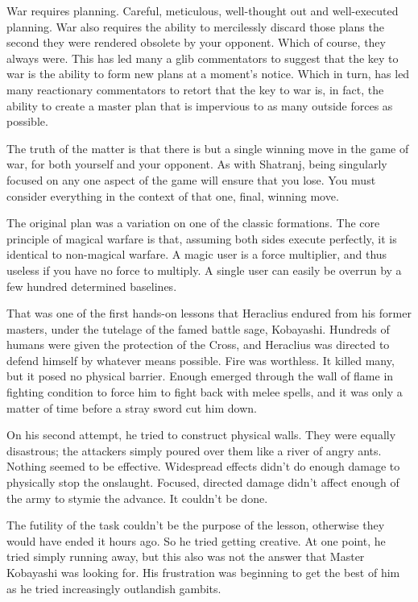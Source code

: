 War requires planning. Careful, meticulous, well-thought out and well-executed planning. War also requires the ability to mercilessly discard those plans the second they were rendered obsolete by your opponent. Which of course, they always were. This has led many a glib commentators to suggest that the key to war is the ability to form new plans at a moment’s notice. Which in turn, has led many reactionary commentators to retort that the key to war is, in fact, the ability to create a master plan that is impervious to as many outside forces as possible.

The truth of the matter is that there is but a single winning move in the game of war, for both yourself and your opponent. As with Shatranj, being singularly focused on any one aspect of the game will ensure that you lose. You must consider everything in the context of that one, final, winning move.

The original plan was a variation on one of the classic formations. The core principle of magical warfare is that, assuming both sides execute perfectly, it is identical to non-magical warfare. A magic user is a force multiplier, and thus useless if you have no force to multiply. A single user can easily be overrun by a few hundred determined baselines.

That was one of the first hands-on lessons that Heraclius endured from his former masters, under the tutelage of the famed battle sage, Kobayashi. Hundreds of humans were given the protection of the Cross, and Heraclius was directed to defend himself by whatever means possible. Fire was worthless. It killed many, but it posed no physical barrier. Enough emerged through the wall of flame in fighting condition to force him to fight back with melee spells, and it was only a matter of time before a stray sword cut him down.

On his second attempt, he tried to construct physical walls. They were equally disastrous; the attackers simply poured over them like a river of angry ants. Nothing seemed to be effective. Widespread effects didn’t do enough damage to physically stop the onslaught. Focused, directed damage didn’t affect enough of the army to stymie the advance. It couldn’t be done.

The futility of the task couldn’t be the purpose of the lesson, otherwise they would have ended it hours ago. So he tried getting creative. At one point, he tried simply running away, but this also was not the answer that Master Kobayashi was looking for. His frustration was beginning to get the best of him as he tried increasingly outlandish gambits.

